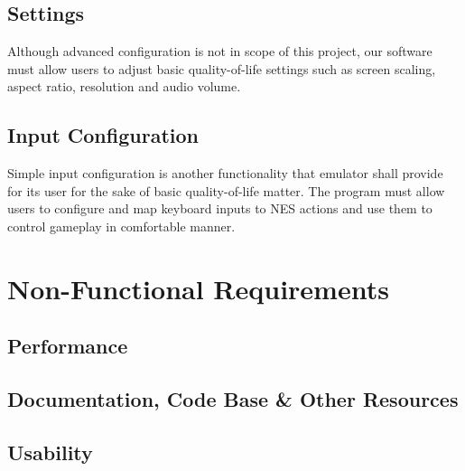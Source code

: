 \documentclass[a4paper, 11pt]{article}
\begin{document}
\subsection{Settings}
Although advanced configuration is not in scope of this project, our software must allow users to adjust basic quality-of-life settings such as screen scaling, aspect ratio, resolution and audio volume.

\subsection{Input Configuration}
Simple input configuration is another functionality that emulator shall provide for its user for the sake of basic quality-of-life matter. The program must allow users to configure and map keyboard inputs to NES actions and use them to control gameplay in comfortable manner.

\section{Non-Functional Requirements}

\subsection{Performance}

\subsection{Documentation, Code Base \& Other Resources}

\subsection{Usability}
\end{document}
